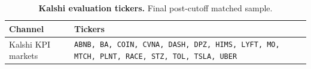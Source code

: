 \begin{table}[t]
\centering
\caption{\textbf{Kalshi evaluation tickers.} Final post-cutoff matched sample.}
\label{tab:kalshi_tickers}
\begin{tabularx}{\linewidth}{@{}l X@{}}
\toprule
Channel & Tickers \\
\midrule
Kalshi KPI markets & \texttt{ABNB, BA, COIN, CVNA, DASH, DPZ, HIMS, LYFT, MO, MTCH, PLNT, RACE, STZ, TOL, TSLA, UBER} \\
\bottomrule
\end{tabularx}
\end{table}
